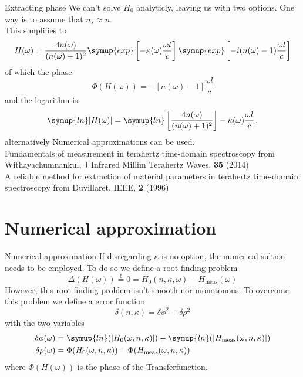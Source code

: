 \documentclass[aspectratio=1610, 9pt]{beamer}
\begin{document}
\begin{frame}{Extracting phase}
  We can't solve $H_0$ analyticly, leaving us with two options.
  One way is to assume that $n_s \approx n$.\\
  This simplifies to 
  \begin{equation}
    H(\omega) = \frac{4n(\omega)}{(n(\omega) + 1)^2} \symup{exp}\left[-\kappa(\omega) \frac{\omega l }{c}\right] \symup{exp}\left[- i(n(\omega) - 1) \frac{\omega l}{c}\right]
  \end{equation}
  of which the phase
  \begin{equation}
    \Phi(H(\omega)) = -[n(\omega) - 1] \frac{\omega l}{c}
  \end{equation}
  and the logarithm is
  \begin{equation}
    \symup{ln}|H(\omega)| = \symup{ln}\left[ \frac{4n(\omega)}{(n(\omega) +1)^2}\right] - \kappa(\omega) \frac{\omega l}{c} \, .
  \end{equation}
alternatively Numerical approximations can be used.\\
\textcolor{tugreen}{Fundamentals of measurement in terahertz time-domain spectroscopy} from Withayachumnankul, J Infrared Millim Terahertz Waves, \textbf{35} (2014)\\
\textcolor{tugreen}{A reliable method for extraction of material parameters in terahertz time-domain spectroscopy} from Duvillaret, IEEE, \textbf{2} (1996)
\end{frame}

\section{Numerical approximation}
\begin{frame}{Numerical approximation}
  If disregarding $\kappa$ is no option, the numerical sultion needs to be employed.
  To do so we define a root finding problem 
  \begin{equation}
    \Delta(H(\omega)) \overset{!}{=} 0 = H_0(n, \kappa, \omega) - H_\text{meas}(\omega)
  \end{equation}
  However, this root finding problem isn't smooth nor monotonous.
  To overcome this problem we define a error function 
  \begin{equation}
    \delta(n, \kappa) = \delta \phi^2 + \delta \rho^2
  \end{equation}
  with the two variables 
  \begin{align}
    \delta \phi(\omega) &= \symup{ln}(\left| H_0(\omega, n , \kappa)\right|) - \symup{ln}(\left| H_\text{meas}(\omega, n , \kappa)\right|) \\
    \delta \rho(\omega) &= \Phi(H_0(\omega, n , \kappa)) - \Phi(H_\text{meas}(\omega, n , \kappa))
  \end{align}
  where $\Phi(H(\omega))$ is the phase of the Transferfunction.
\end{frame}
\end{document}
